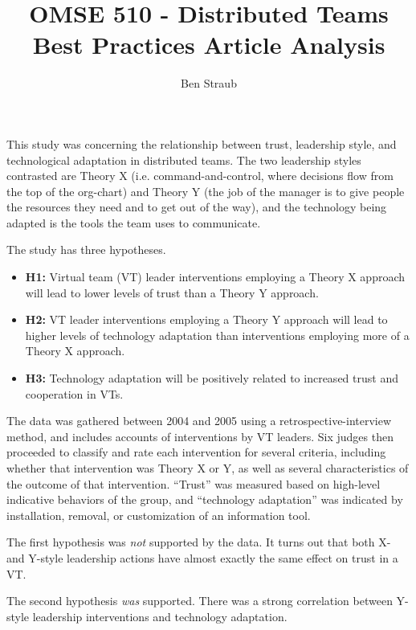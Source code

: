 \documentclass[11pt]{article}
\makeatletter
\def\s@btitle{\relax}
\def\subtitle#1{\gdef\s@btitle{#1}}
\makeatother
\begin{document}
\title{OMSE 510 - Distributed Teams \\ Best Practices Article Analysis}
\subtitle{Building Trust and Cooperation through Technology Adaptation in Virtual Teams: Empirical Field Evidence}
\author{Ben Straub}
\maketitle

This study was concerning the relationship between trust, leadership style, and technological
adaptation in distributed teams.  The two leadership styles contrasted are Theory X
(i.e. command-and-control, where decisions flow from the top of the org-chart) and Theory Y (the job
of the manager is to give people the resources they need and to get out of the way), and the
technology being adapted is the tools the team uses to communicate.

The study has three hypotheses.

\begin{itemize}
\item \textbf{H1:} Virtual team (VT) leader interventions employing a Theory X approach will lead to
  lower levels of trust than a Theory Y approach.
\item \textbf{H2:} VT leader interventions employing a Theory Y approach will lead to higher levels
  of technology adaptation than interventions employing more of a Theory X approach.
\item \textbf{H3:} Technology adaptation will be positively related to increased trust and
  cooperation in VTs.
\end{itemize}

The data was gathered between 2004 and 2005 using a retrospective-interview method, and includes
accounts of interventions by VT leaders.  Six judges then proceeded to classify and rate each
intervention for several criteria, including whether that intervention was Theory X or Y, as well as
several characteristics of the outcome of that intervention.  ``Trust'' was measured based on
high-level indicative behaviors of the group, and ``technology adaptation'' was indicated by
installation, removal, or customization of an information tool.

The first hypothesis was \textit{not} supported by the data.  It turns out that both X- and Y-style
leadership actions have almost exactly the same effect on trust in a VT.  

The second hypothesis \textit{was} supported.  There was a strong correlation between Y-style
leadership interventions and technology adaptation.
\end{document}
